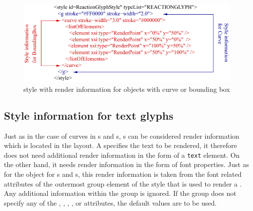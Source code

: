 \begin{figure}[!h]
\begin{center}
\includegraphics{figures/CurveAndBBStyle.pdf}
\end{center}
\caption{style with render information for objects with curve or bounding box}
\label{CurveAndBBStyle}
\end{figure}

\subsection{Style information for text glyphs}
Just as in the case of curves in {}s and {}s,
{}s can be considered render information which is located
in the layout. A  specifies the text to be rendered,
it therefore does not need additional render information in the form of
a \texttt{text} element. On the other hand, it needs render information in the form of font properties.
Just as for the \RenderCurve
object for {}s and {}s, this render information is
taken from the font related attributes of the outermost group element of the
style that is used to render a . Any additional information within the
group is ignored. If the group does not specify any of the ,
, , , 
 or  attributes, the default values are to be used.

